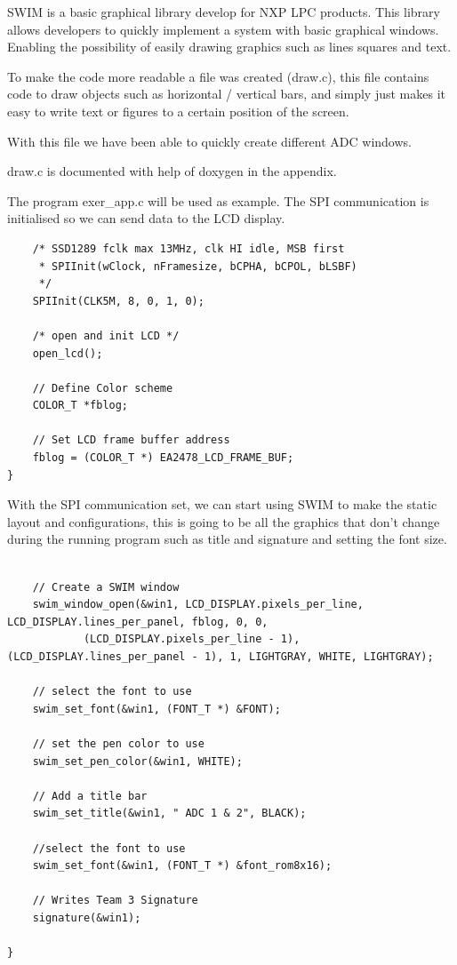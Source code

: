 SWIM is a basic graphical library develop for NXP LPC products. This library allows developers to quickly implement a system with basic graphical windows. \\ Enabling the possibility of easily drawing graphics such as lines squares and text.

To make the code more readable a file was created (draw.c), this file contains code to draw objects such as horizontal / vertical bars, and simply just makes it easy to write text or figures to a certain position of the screen.

With this file we have been able to quickly create different ADC windows.

draw.c is documented with help of doxygen in the appendix.

The program exer\_app.c will be used as example.
The SPI communication is initialised so we can send data to the LCD display.

\begin{lstlisting}
	/* SSD1289 fclk max 13MHz, clk HI idle, MSB first
	 * SPIInit(wClock, nFramesize, bCPHA, bCPOL, bLSBF)
	 */
	SPIInit(CLK5M, 8, 0, 1, 0);

	/* open and init LCD */
	open_lcd();

	// Define Color scheme
	COLOR_T *fblog;

	// Set LCD frame buffer address
	fblog = (COLOR_T *) EA2478_LCD_FRAME_BUF;
}

\end{lstlisting}

With the SPI communication set, we can start using SWIM to make the static layout and configurations, this is going to be all the graphics that don't change during the running program such as title and signature and setting the font size.

\begin{lstlisting}

	// Create a SWIM window
	swim_window_open(&win1, LCD_DISPLAY.pixels_per_line, LCD_DISPLAY.lines_per_panel, fblog, 0, 0,
			(LCD_DISPLAY.pixels_per_line - 1), (LCD_DISPLAY.lines_per_panel - 1), 1, LIGHTGRAY, WHITE, LIGHTGRAY);

	// select the font to use
	swim_set_font(&win1, (FONT_T *) &FONT);

	// set the pen color to use
	swim_set_pen_color(&win1, WHITE);

	// Add a title bar
	swim_set_title(&win1, " ADC 1 & 2", BLACK);

	//select the font to use
	swim_set_font(&win1, (FONT_T *) &font_rom8x16);

	// Writes Team 3 Signature
	signature(&win1);

}

\end{lstlisting}
 
